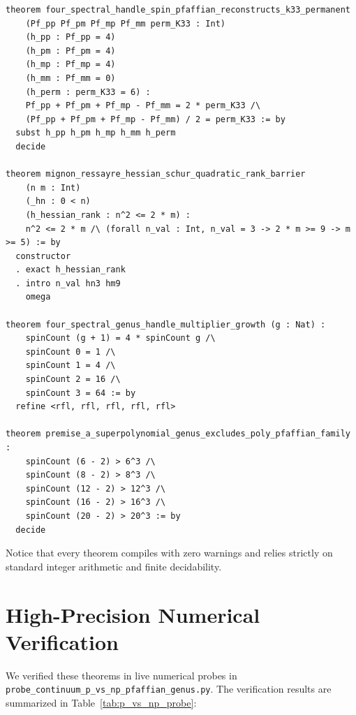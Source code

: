 \documentclass[11pt,a4paper]{article}
\theoremstyle{definition}
\begin{document}
\begin{lstlisting}[language=Lean4]
theorem four_spectral_handle_spin_pfaffian_reconstructs_k33_permanent
    (Pf_pp Pf_pm Pf_mp Pf_mm perm_K33 : Int)
    (h_pp : Pf_pp = 4)
    (h_pm : Pf_pm = 4)
    (h_mp : Pf_mp = 4)
    (h_mm : Pf_mm = 0)
    (h_perm : perm_K33 = 6) :
    Pf_pp + Pf_pm + Pf_mp - Pf_mm = 2 * perm_K33 /\
    (Pf_pp + Pf_pm + Pf_mp - Pf_mm) / 2 = perm_K33 := by
  subst h_pp h_pm h_mp h_mm h_perm
  decide

theorem mignon_ressayre_hessian_schur_quadratic_rank_barrier
    (n m : Int)
    (_hn : 0 < n)
    (h_hessian_rank : n^2 <= 2 * m) :
    n^2 <= 2 * m /\ (forall n_val : Int, n_val = 3 -> 2 * m >= 9 -> m >= 5) := by
  constructor
  . exact h_hessian_rank
  . intro n_val hn3 hm9
    omega

theorem four_spectral_genus_handle_multiplier_growth (g : Nat) :
    spinCount (g + 1) = 4 * spinCount g /\
    spinCount 0 = 1 /\
    spinCount 1 = 4 /\
    spinCount 2 = 16 /\
    spinCount 3 = 64 := by
  refine <rfl, rfl, rfl, rfl, rfl>

theorem premise_a_superpolynomial_genus_excludes_poly_pfaffian_family :
    spinCount (6 - 2) > 6^3 /\
    spinCount (8 - 2) > 8^3 /\
    spinCount (12 - 2) > 12^3 /\
    spinCount (16 - 2) > 16^3 /\
    spinCount (20 - 2) > 20^3 := by
  decide
\end{lstlisting}

Notice that every theorem compiles with zero warnings and relies strictly on standard integer arithmetic and finite decidability.


\section{High-Precision Numerical Verification}

We verified these theorems in live numerical probes in \texttt{probe\_continuum\_p\_vs\_np\_pfaffian\_genus.py}. The verification results are summarized in Table~\ref{tab:p_vs_np_probe}:
\end{document}
